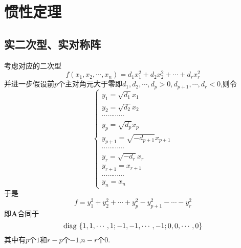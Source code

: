 \newpage
\section{惯性定理}
\subsection{实二次型、实对称阵}
考虑对应的二次型\[
    f\left(
    x_1,x_2,\cdots,x_n
    \right)=d_1x_1^2+d_2x_2^2+\cdots+d_rx_r^2
\]并进一步假设前$p$个主对角元大于零即$d_1,d_2,\cdots,d_p>0,d_{p+1},\cdots,d_r<0$,则令\[
    \begin{cases*}
        y_1=\sqrt{d_1}x_1              \\
        y_2=\sqrt{d_2}x_2              \\
        \cdots\cdots\cdots\cdots       \\
        y_p=\sqrt{d_p}x_p              \\
        y_{p+1}=\sqrt{-d_{p+1}}x_{p+1} \\
        \cdots\cdots\cdots\cdots       \\
        y_r=\sqrt{-d_r}x_r             \\
        y_{r+1}=x_{r+1}                \\
        \cdots\cdots\cdots\cdots       \\
        y_n=x_n
    \end{cases*}
\]于是\[
    f=y_1^2+y_2^2+\cdots+y_p^2-y_{p+1}^2-\cdots-y_r^2
\]即$\bm{A}$合同于\[
    \operatorname{diag\,} \left\{
    1,1,\cdots,1;-1,-1,\cdots,-1;0,0,\cdots,0
    \right\}
\]其中有$p$个$1$和$r-p$个$-1$,$n-r$个$0$.
